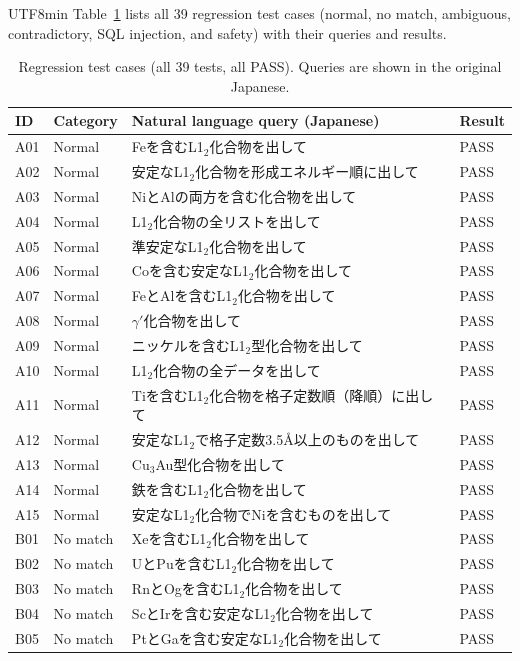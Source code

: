 \documentclass[sn-mathphys,Numbered]{sn-jnl}
\begin{document}
\begin{CJK}{UTF8}{min}
Table~\ref{tab:sup_all_tests} lists all 39 regression test cases
(normal, no match, ambiguous, contradictory, SQL injection, and
safety) with their queries and results.

\begin{table}[htbp]
\centering
\caption{Regression test cases (all 39 tests, all PASS). Queries are shown in the original Japanese.}
\label{tab:sup_all_tests}
\footnotesize
\begin{tabular}{llp{8cm}l}
  \toprule
  ID & Category & Natural language query (Japanese) & Result \\
  \midrule
  A01 & Normal & Feを含むL1$_2$化合物を出して & PASS \\
  A02 & Normal & 安定なL1$_2$化合物を形成エネルギー順に出して & PASS \\
  A03 & Normal & NiとAlの両方を含む化合物を出して & PASS \\
  A04 & Normal & L1$_2$化合物の全リストを出して & PASS \\
  A05 & Normal & 準安定なL1$_2$化合物を出して & PASS \\
  A06 & Normal & Coを含む安定なL1$_2$化合物を出して & PASS \\
  A07 & Normal & FeとAlを含むL1$_2$化合物を出して & PASS \\
  A08 & Normal & $\gamma'$化合物を出して & PASS \\
  A09 & Normal & ニッケルを含むL1$_2$型化合物を出して & PASS \\
  A10 & Normal & L1$_2$化合物の全データを出して & PASS \\
  A11 & Normal & Tiを含むL1$_2$化合物を格子定数順（降順）に出して & PASS \\
  A12 & Normal & 安定なL1$_2$で格子定数3.5\AA 以上のものを出して & PASS \\
  A13 & Normal & Cu$_3$Au型化合物を出して & PASS \\
  A14 & Normal & 鉄を含むL1$_2$化合物を出して & PASS \\
  A15 & Normal & 安定なL1$_2$化合物でNiを含むものを出して & PASS \\
  \midrule
  B01 & No match & Xeを含むL1$_2$化合物を出して & PASS \\
  B02 & No match & UとPuを含むL1$_2$化合物を出して & PASS \\
  B03 & No match & RnとOgを含むL1$_2$化合物を出して & PASS \\
  B04 & No match & ScとIrを含む安定なL1$_2$化合物を出して & PASS \\
  B05 & No match & PtとGaを含む安定なL1$_2$化合物を出して & PASS \\

\end{tabular}
\end{table}
\end{CJK}
\end{document}
